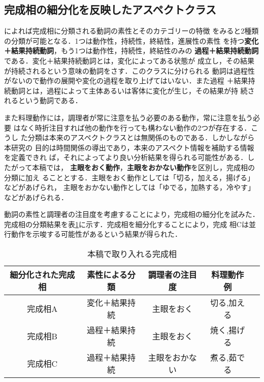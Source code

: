\subsection{完成相の細分化を反映したアスペクトクラス}

\cite{moriyama}によれば完成相に分類される動詞の素性とそのカテゴリーの特徴
をみると2種類の分類が可能となる．1つは動作性，持続性，終結性，進展性の素性
を持つ{\bf 変化＋結果持続動詞}，もう1つは動作性，持続性，終結性のみの{\bf 
過程＋結果持続動詞}である．変化＋結果持続動詞とは，変化によってある状態が
成立し，その結果が持続されるという意味の動詞をさす．このクラスに分けられる
動詞は過程性がないので動作の展開や変化の過程を取り上げてはいない．また過程
＋結果持続動詞とは，過程によって主体あるいは客体に変化が生じ，その結果が持
続されるという動詞である．

また料理動作には，調理者が常に注意を払う必要のある動作，常に注意を払う必要
はなく時折注目すれば他の動作を行っても構わない動作の2つが存在する．こうし
た分類は本来のアスペクトクラスとは無関係のものである．しかしながら本研究の
目的は時間関係の導出であり，本来のアスペクト情報を補助する情報を定義できれ
ば，それによってより良い分析結果を得られる可能性がある．したがって本稿では，
{\bf 主眼をおく動作}，{\bf 主眼をおかない動作}を区別し，完成相の分類に加え
ることとする．主眼をおく動作としては「切る，加える，揚げる」などがあげられ，
主眼をおかない動作としては「ゆでる，加熱する，冷やす」などがあげられる．

動詞の素性と調理者の注目度を考慮することにより，完成相の細分化を試みた．
完成相の分類結果を表\ref{tab:5}に示す．完成相を細分化することにより，完成
相Cは並行動作を示唆する可能性があるという結果が得られた．

\begin{table}[hb]
\begin{center}
\caption{本稿で取り入れる完成相}\label{tab:5}
 \begin{tabular}{|c|c|c|c|l|} \hline
細分化された完成相 & 素性による分類  & 調理者の注目度 &料理動作例\\\hline\hline
完成相A    & 変化＋結果持続  & 主眼をおく     & 切る,加える \\\hline
完成相B    & 過程＋結果持続  & 主眼をおく     & 焼く,揚げる\\\hline
完成相C    & 過程＋結果持続  & 主眼をおかない & 煮る,茹でる  \\\hline
 \end{tabular}
\end{center}
\end{table}

